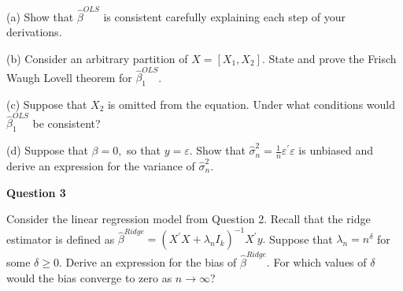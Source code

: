 \documentclass{article}
\begin{document}
(a) Show that $\hat{\beta}^{OLS}$ is consistent carefully explaining each
step of your derivations.

(b) Consider an arbitrary partition of $X=[X_{1},X_{2}].$ State and prove
the Frisch Waugh Lovell theorem for $\hat{\beta}_{1}^{OLS}$.

(c) Suppose that $X_{2}$ is omitted from the equation. Under what conditions
would $\hat{\beta}_{1}^{OLS}$ be consistent?

(d) Suppose that $\beta =0,$ so that $y=\varepsilon .$ Show that $\hat{\sigma%
}_{n}^{2}=\frac{1}{n}\varepsilon ^{\prime }\varepsilon $ is unbiased and
derive an expression for the variance of $\hat{\sigma}_{n}^{2}.$

\bigskip

\textbf{Question 3 }

Consider the linear regression model from Question 2. Recall that the ridge
estimator is defined as $\hat{\beta}^{Ridge}=\left( X^{\prime }X+\lambda
_{n}I_{k}\right) ^{-1}X^{\prime }y.$ Suppose that $\lambda _{n}=n^{\delta }$
for some $\delta \geq 0.$ Derive an expression for the bias of $\hat{\beta}%
^{Ridge}.$ For which values of $\delta $ would the bias converge to zero as $%
n\rightarrow \infty $?
\end{document}
